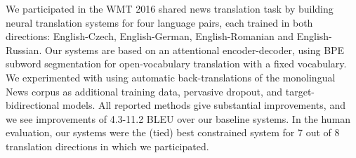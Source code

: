 We participated in the WMT 2016 shared news translation task by building neural translation systems for four language pairs, each trained in both directions: English-Czech, English-German, English-Romanian and English-Russian. Our systems are based on an attentional encoder-decoder, using BPE subword segmentation for open-vocabulary translation with a fixed vocabulary. We experimented with using automatic back-translations of the monolingual News corpus as additional training data, pervasive dropout, and target-bidirectional models. All reported methods give substantial improvements, and we see improvements of 4.3-11.2 BLEU over our baseline systems. In the human evaluation, our systems were the (tied) best constrained system for 7 out of 8 translation directions in which we participated.
